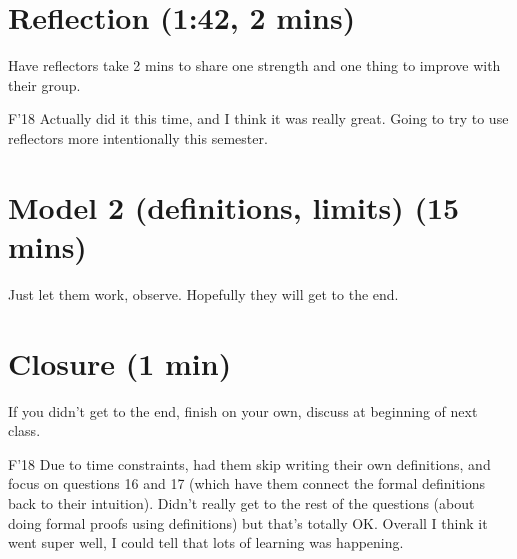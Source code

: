 \documentclass{tufte-handout}
\begin{document}
\section{Reflection (1:42, 2 mins)}

Have reflectors take 2 mins to share one strength and one thing to
improve with their group.

\begin{reflect}{F'18}
  Actually did it this time, and I think it was really great.  Going
  to try to use reflectors more intentionally this semester.
\end{reflect}

\section{Model 2 (definitions, limits) (15 mins)}

Just let them work, observe.  Hopefully they will get to the end.

\section{Closure (1 min)}

If you didn't get to the end, finish on your own, discuss at
beginning of next class.

\begin{reflect}{F'18}
  Due to time constraints, had them skip writing their own
  definitions, and focus on questions 16 and 17 (which have them
  connect the formal definitions back to their intuition).  Didn't
  really get to the rest of the questions (about doing formal proofs
  using definitions) but that's totally OK.  Overall I think it went
  super well, I could tell that lots of learning was happening.
\end{reflect}
\end{document}
